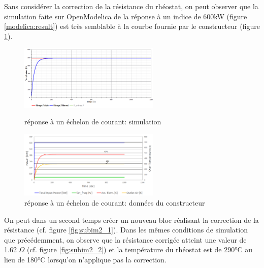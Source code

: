 \documentclass[a4paper]{report}
\begin{document}
		
	Sans considérer la correction de la résistance du rhéostat, on peut observer que la simulation faite sur OpenModelica de la réponse à un indice de 600kW (figure \ref{modelica:result}) est très semblable à la courbe fournie par le constructeur (figure \ref{data:result}).
	\begin{figure}[h]			
		\centering
		\includegraphics[width=0.6\textwidth]{rh_modelica_result}
		\caption{réponse à un échelon de courant: simulation}
		\label{modelica:result}
		\includegraphics[width=0.6\textwidth]{rh_data_result}
		\caption{réponse à un échelon de courant: données du constructeur}
		\label{data:result}
	\end{figure}
	\pagebreak %
	On peut dans un second temps créer un nouveau bloc réalisant la correction de la résistance (cf. figure \ref{fig:subim2_1}). Dans les mêmes conditions de simulation que précédemment, on observe que la résistance corrigée atteint une valeur de 1.62 $\Omega$ (cf. figure \ref{fig:subim2_2}) et la température du rhéostat est de 290°C au lieu de 180°C lorsqu'on n'applique pas la correction.
\end{document}
